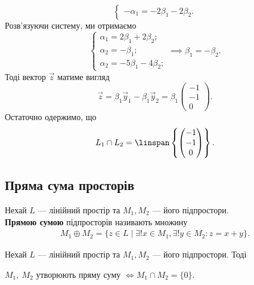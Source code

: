 \documentclass{math_library}
\begin{document}
\begin{example}
\begin{enumerate}[wide=0pt,label={\Roman*.}]
\[\begin{cases}
	- \alpha_1 = -2 \beta_1 - 2 \beta_2.
	\end{cases}
\]
	Розв'язуючи систему, ми отримаємо
	\[
	\begin{cases}
	\alpha_1 = 2\beta_1 + 2\beta_2; \\
	\alpha_2 = -\beta_1; \\
	\alpha_2 = -5\beta_1 - 4\beta_2;
	\end{cases} \implies \beta_1 = -\beta_2.
	\]
	Тоді вектор $\vec{z}$ матиме вигляд
	\[
	\vec{z} =\beta_1 \vec{y}_1 - \beta_1 \vec{y}_2 = \beta_1 \begin{pmatrix} -1 \\ -1 \\ 0 \end{pmatrix}.
	\]
	Остаточно одержимо, що 
	\[
	L_1 \cap L_2 = \linspan\left\{ \begin{pmatrix} -1 \\ -1 \\ 0 \end{pmatrix} \right\}.
	\]
	\end{enumerate}
	\end{example}
	
	\subsection{Пряма сума просторів}
	\begin{definition}
	Нехай $L$ --- лінійний простір та $M_1, M_2$ --- його підпростори.\\
	\textbf{Прямою сумою} підпросторів називають множину
	\begin{align*}
	M_1 \oplus M_2 = \{z \in L \mid \exists! x \in M_1, \exists! y \in M_2: z = x+y\}.
	\end{align*}
	\end{definition}
	
	\begin{proposition}
	Нехай $L$ --- лінійний простір та $M_1, M_2$ --- його підпростори. Тоді
	\begin{center} 
	$M_1,\ M_2$ утворюють пряму суму $\iff M_1 \cap M_2 = \{0\}$.
	\end{center}
	\end{proposition}
	
\end{document}
